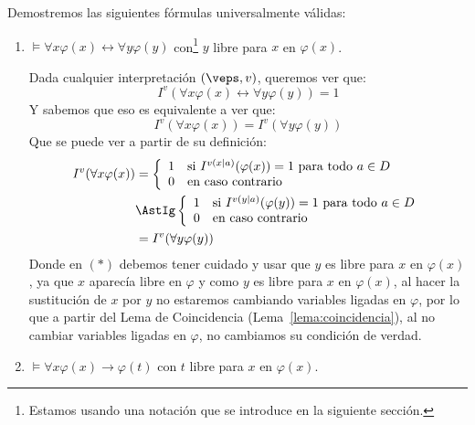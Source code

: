 \begin{ejemplo}
    Demostremos las siguientes fórmulas universalmente válidas:
    \begin{enumerate}
        \item $\vDash \forall x\varphi(x) \leftrightarrow \forall y\varphi(y)$ con\footnote{Estamos usando una notación que se introduce en la siguiente sección.} $y$ libre para $x$ en $\varphi(x)$.

            Dada cualquier interpretación $(\veps, v)$, queremos ver que:
            \begin{equation*}
                I^v(\forall x\varphi(x)\leftrightarrow \forall y\varphi(y)) = 1
            \end{equation*}
            Y sabemos que eso es equivalente a ver que:
            \begin{equation*}
                I^v(\forall x\varphi(x)) = I^v(\forall y\varphi(y))
            \end{equation*}
            Que se puede ver a partir de su definición:
            \begin{align*}
                I^v(\forall x\varphi(x)) &= \left\{\begin{array}{ll}
                        1 & \text{si\ } I^{v(x\mid a)}(\varphi(x)) = 1 \text{\ para todo\ } a\in D \\
                        0 & \text{en caso contrario} 
                \end{array}\right.  \\
                                         &\AstIg \left\{\begin{array}{ll}
                        1 & \text{si\ } I^{v(y\mid a)}(\varphi(y)) = 1 \text{\ para todo\ } a\in D \\
                        0 & \text{en caso contrario} 
                \end{array}\right. \\
                                         &= I^v(\forall y\varphi(y))
            \end{align*}
            Donde en $(\ast)$ debemos tener cuidado y usar que $y$ es libre para $x$ en $\varphi(x)$, ya que $x$ aparecía libre en $\varphi$ y como $y$ es libre para $x$ en $\varphi(x)$, al hacer la sustitución de $x$ por $y$ no estaremos cambiando variables ligadas en $\varphi$, por lo que a partir del Lema de Coincidencia (Lema~\ref{lema:coincidencia}), al no cambiar variables ligadas en $\varphi$, no cambiamos su condición de verdad.
        \item $\vDash \forall x\varphi(x)\to \varphi(t)$ con $t$ libre para $x$ en $\varphi(x)$.


\end{enumerate}
\end{ejemplo}
